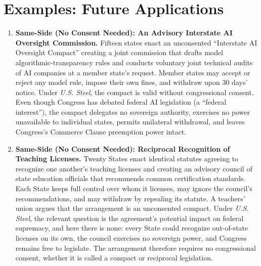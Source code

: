 \documentclass[12pt]{article}
\begin{document}
\section{Examples: Future Applications}
\begin{enumerate}

\item \textbf{Same-Side (No Consent Needed): An Advisory Interstate AI Oversight Commission.} Fifteen states enact an unconsented ``Interstate AI Oversight Compact'' creating a joint commission that drafts model algorithmic-transparency rules and conducts voluntary joint technical audits of AI companies at a member state's request. Member states may accept or reject any model rule, impose their own fines, and withdraw upon 30 days' notice. Under \textit{U.S. Steel}, the compact is valid without congressional consent. Even though Congress has debated federal AI legislation (a ``federal interest''), the compact delegates no sovereign authority, exercises no power unavailable to individual states, permits unilateral withdrawal, and leaves Congress's Commerce Clause preemption power intact.

\item \textbf{Same-Side (No Consent Needed): Reciprocal Recognition of Teaching Licenses.} Twenty States enact identical statutes agreeing to recognize one another's teaching licenses and creating an advisory council of state education officials that recommends common certification standards. Each State keeps full control over whom it licenses, may ignore the council's recommendations, and may withdraw by repealing its statute. A teachers' union argues that the arrangement is an unconsented compact. Under \textit{U.S. Steel}, the relevant question is the agreement's potential impact on federal supremacy, and here there is none: every State could recognize out-of-state licenses on its own, the council exercises no sovereign power, and Congress remains free to legislate. The arrangement therefore requires no congressional consent, whether it is called a compact or reciprocal legislation.


\end{enumerate}
\end{document}

